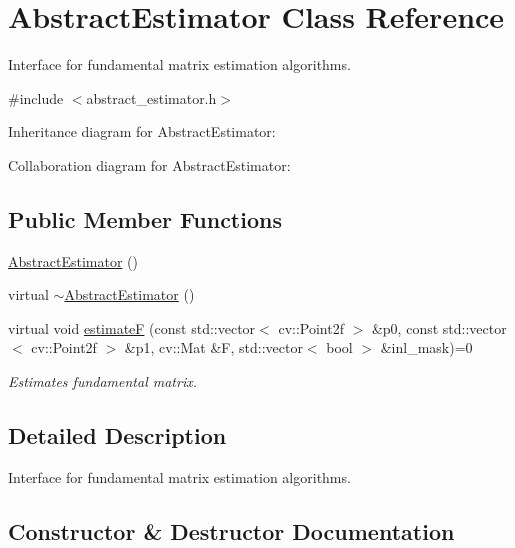 \hypertarget{classAbstractEstimator}{}\section{Abstract\+Estimator Class Reference}
\label{classAbstractEstimator}


Interface for fundamental matrix estimation algorithms.  




{\ttfamily \#include $<$abstract\+\_\+estimator.\+h$>$}



Inheritance diagram for Abstract\+Estimator\+:


Collaboration diagram for Abstract\+Estimator\+:
\subsection*{Public Member Functions}
\begin{DoxyCompactItemize}
\item 
\hyperlink{classAbstractEstimator_ae264b354a4a61e7d9af24ca98aed241d}{Abstract\+Estimator} ()
\item 
virtual \hyperlink{classAbstractEstimator_a0d3919acb3c173e763ef77b24b2be7a7}{$\sim$\+Abstract\+Estimator} ()
\item 
virtual void \hyperlink{classAbstractEstimator_a9d5a1dcb64b35f5996351018a5eb9e0a}{estimate\+F} (const std\+::vector$<$ cv\+::\+Point2f $>$ \&p0, const std\+::vector$<$ cv\+::\+Point2f $>$ \&p1, cv\+::\+Mat \&F, std\+::vector$<$ bool $>$ \&inl\+\_\+mask)=0
\begin{DoxyCompactList}\small\item\em Estimates fundamental matrix. \end{DoxyCompactList}\end{DoxyCompactItemize}


\subsection{Detailed Description}
Interface for fundamental matrix estimation algorithms. 

\subsection{Constructor \& Destructor Documentation}
\hypertarget{classAbstractEstimator_ae264b354a4a61e7d9af24ca98aed241d}{}
